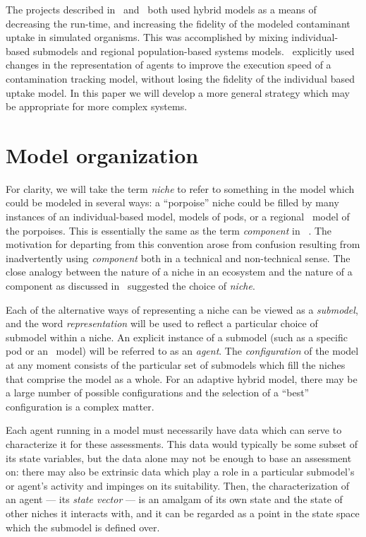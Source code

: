 The projects described in~\cite{Little2006nws} and~\cite{Fulton2011ningaloo}
both used hybrid models as a means of decreasing the run-time, and
increasing the fidelity of the modeled contaminant uptake in 
simulated organisms. This was accomplished by mixing in\-di\-vidu\-al-based
sub\-models and regional population-based systems
models.~\cite{Gray2012adaptive} explicitly used changes in the rep\-re\-sentation
of agents to improve the execution speed of a contamination tracking
model, without losing the fidelity of the in\-di\-vidu\-al based uptake
model. In this paper we will develop a more general strategy which may
be appropriate for more complex systems.


\section{Model organization}

For clarity, we will take the term \emph{niche} to refer to something
in the model which could be modeled in several ways: a ``porpoise''
niche could be filled by many instances of an in\-di\-vidu\-al-based
model, models of pods, or a regional \SD\ model of the porpoises.
This is essentially the same as the term \emph{component} in~
\cite{vincenot2011theoretical}. The motivation for departing from this
convention arose from confusion resulting from inadvertently using
\emph{component} both in a technical and non-technical sense.  The
close analogy between the nature of a niche in an ecosystem and the
nature of a component as discussed in~\cite{vincenot2011theoretical}
suggested the choice of \emph{niche}. 

Each of the alternative ways of representing a niche can be viewed as
a \emph{sub\-model}, and the word \emph{rep\-re\-sen\-ta\-tion} will
be used to reflect a particular choice of sub\-model within a niche.
An explicit instance of a sub\-model (such as a specific pod or an
\SD\ model) will be referred to as an \emph{agent}.  The
\emph{con\-fig\-ur\-a\-tion} of the model at any moment consists of
the particular set of sub\-models which fill the niches that comprise
the model as a whole. For an adaptive hybrid model, there may be a
large number of possible con\-fig\-ur\-a\-tions and the selection of a
``best'' con\-fig\-ur\-a\-tion is a complex matter.

Each agent running in a model must necessarily have data which can
serve to characterize it for these assessments. This data would
typically be some subset of its state variables, but the data alone
may not be enough to base an assessment on: there may also be
extrinsic data which play a role in a particular sub\-model's or agent's
activity and impinges on its suitability. Then, the characterization
of an agent --- its \emph{state vector} --- is an amalgam of its own
state and the state of other niches it interacts with, and it can be
regarded as a point in the state space which the sub\-model is defined
over. 

